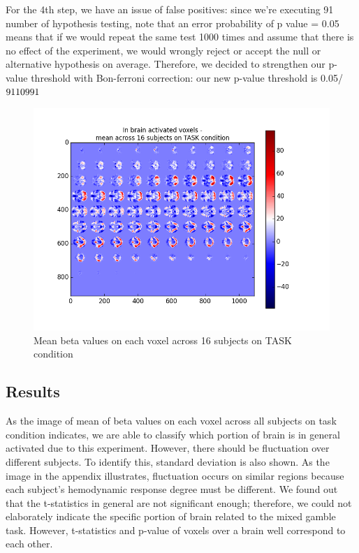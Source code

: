 For the 4th step, we have an issue of false positives: since we're executing 91 number of hypothesis testing, note that an error probability of p value = 0.05 means that if we would repeat the same test 1000 times and assume that there is no effect of the experiment, we would wrongly reject or accept the null or alternative hypothesis on average. Therefore, we decided to strengthen our p-value threshold with Bon-ferroni correction: our new p-value threshold is 0.05/\(91\*109\*91\)

\begin{figure}[H] 
\centering \includegraphics[scale=0.5]{../fig/multi_beta/mean_task.png}	 
\caption{Mean beta values on each voxel across 16 subjects on TASK condition}
\end{figure} 


\subsection {Results}
As the image of mean of beta values on each voxel across all subjects on task condition indicates, we are able to classify which portion of brain is in general activated due to this experiment. However, there should be fluctuation over different subjects. To identify this, standard deviation is also shown. As the image in the appendix illustrates, fluctuation occurs on similar regions because each subject's hemodynamic response degree must be different. We found out that the t-statistics in general are not significant enough; therefore, we could not elaborately indicate the specific portion of brain related to the mixed gamble task. However, t-statistics and p-value of voxels over a brain well correspond to each other.





